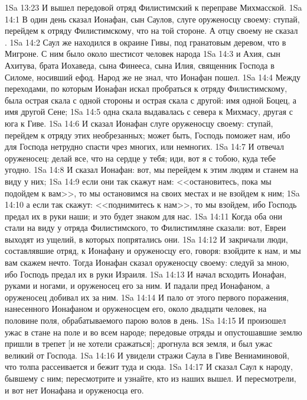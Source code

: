 \vs 1Sa 13:23 И вышел передовой отряд Филистимский к переправе Михмасской.
\vs 1Sa 14:1 В один день сказал Ионафан, сын Саулов, слуге оруженосцу своему: ступай, перейдем к отряду Филистимскому, что на той стороне. А отцу своему не сказал .
\vs 1Sa 14:2 Саул же находился в окраине Гивы, под гранатовым деревом, что в Мигроне. С ним было около шестисот человек народа
\vs 1Sa 14:3 и Ахия, сын Ахитува, брата Иохаведа, сына Финееса, сына Илия, священник Господа в Силоме, носивший ефод. Народ же не знал, что Ионафан пошел.
\vs 1Sa 14:4 Между переходами, по которым Ионафан искал пробраться к отряду Филистимскому, была острая скала с одной стороны и острая скала с другой: имя одной Боцец, а имя другой Сене;
\vs 1Sa 14:5 одна скала выдавалась с севера к Михмасу, другая с юга к Гиве.
\vs 1Sa 14:6 И сказал Ионафан слуге оруженосцу своему: ступай, перейдем к отряду этих необрезанных; может быть, Господь поможет нам, ибо для Господа нетрудно спасти чрез многих, или немногих.
\vs 1Sa 14:7 И отвечал оруженосец: делай все, что на сердце у тебя; иди, вот я с тобою, куда тебе угодно.
\vs 1Sa 14:8 И сказал Ионафан: вот, мы перейдем к этим людям и станем на виду у них;
\vs 1Sa 14:9 если они так скажут нам: <<остановитесь, пока мы подойдем к вам>>, то мы остановимся на своих местах и не взойдем к ним;
\vs 1Sa 14:10 а если так скажут: <<поднимитесь к нам>>, то мы взойдем, ибо Господь предал их в руки наши; и это будет знаком для нас.
\vs 1Sa 14:11 Когда оба они стали на виду у отряда Филистимского, то Филистимляне сказали: вот, Евреи выходят из ущелий, в которых попрятались они.
\vs 1Sa 14:12 И закричали люди, составлявшие отряд, к Ионафану и оруженосцу его, говоря: взойдите к нам, и мы вам скажем нечто. Тогда Ионафан сказал оруженосцу своему: следуй за мною, ибо Господь предал их в руки Израиля.
\vs 1Sa 14:13 И начал всходить Ионафан,  руками и ногами, и оруженосец его за ним. И падали  пред Ионафаном, а оруженосец добивал их за ним.
\vs 1Sa 14:14 И пало от этого первого поражения, нанесенного Ионафаном и оруженосцем его, около двадцати человек, на половине поля, обрабатываемого парою волов в день.
\vs 1Sa 14:15 И произошел ужас в стане на поле и во всем народе; передовые отряды и опустошавшие землю пришли в трепет [и не хотели сражаться]; дрогнула вся земля, и был ужас великий от Господа.
\vs 1Sa 14:16 И увидели стражи Саула в Гиве Вениаминовой, что толпа рассеивается и бежит туда и сюда.
\vs 1Sa 14:17 И сказал Саул к народу, бывшему с ним; пересмотрите и узнайте, кто из наших вышел. И пересмотрели, и вот нет Ионафана и оруженосца его.

